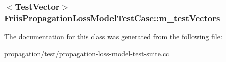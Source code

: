 \subsubsection[{\texorpdfstring{m\+\_\+test\+Vectors}{m_testVectors}}]{$<${\bf Test\+Vector}$>$ Friis\+Propagation\+Loss\+Model\+Test\+Case\+::m\+\_\+test\+Vectors\hspace{0.3cm}{\ttfamily [private]}}\hypertarget{classFriisPropagationLossModelTestCase_a9fa3d0d4e10d07b03b540192c8453e00}{}\label{classFriisPropagationLossModelTestCase_a9fa3d0d4e10d07b03b540192c8453e00}


The documentation for this class was generated from the following file\+:\begin{DoxyCompactItemize}
\item 
propagation/test/\hyperlink{propagation-loss-model-test-suite_8cc}{propagation-\/loss-\/model-\/test-\/suite.\+cc}\end{DoxyCompactItemize}
